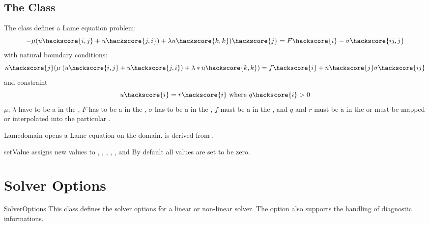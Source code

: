 \subsection{The \Lame Class}
The \Lame class defines a Lame equation problem:
\begin{equation}\label{LE.1}
-\mu (u\hackscore{i,j}+u\hackscore{j,i})+\lambda u\hackscore{k,k})\hackscore{j} = F\hackscore{i}-\sigma\hackscore{ij,j}
\end{equation}
with natural boundary conditions:
\begin{equation}\label{LE.2}
n\hackscore{j}(\mu \; (u\hackscore{i,j}+u\hackscore{j,i})+\lambda*u\hackscore{k,k}) = f\hackscore{i}+n\hackscore{j}\sigma\hackscore{ij}
\end{equation}
and constraint
\begin{equation}\label{LE.3}
u\hackscore{i}=r\hackscore{i} \mbox{ where } q\hackscore{i}>0
\end{equation}
$\mu$, $\lambda$ have to be a \Scalar in the \Function,
$F$ has to be a \Vector in the \Function,
$\sigma$ has to be a \Tensor in the \Function,
$f$ must be a \Vector in  the \FunctionOnBoundary,
and $q$ and $r$ must be a \Vector in  the \SolutionFS or must be mapped or interpolated into the particular \FunctionSpace.

\begin{classdesc}{Lame}{domain}
opens a Lame equation on the \Domain domain. \Lame is derived from \LinearPDE.
\end{classdesc}
\begin{methoddesc}[Lame]{setValue}{       }
assigns new values to 
,
,
,
,
,
 and
By default all values are set to be zero.
\end{methoddesc}


\section{Solver Options}
\label{SEC Solver Options}

\begin{classdesc}{SolverOptions}{}
This class defines the solver options for a linear or non-linear solver.
The option also supports the handling of diagnostic informations. 
\end{classdesc}

